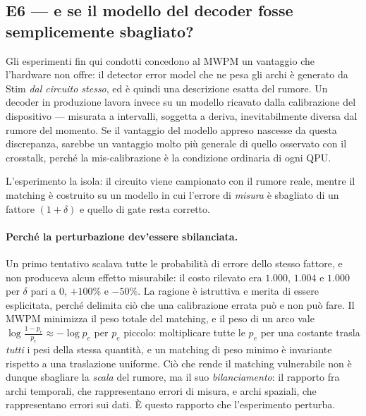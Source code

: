 \subsection{E6 --- e se il modello del decoder fosse semplicemente sbagliato?}
\label{subsec:neural_miscalibrato}

Gli esperimenti fin qui condotti concedono al \ac{MWPM} un vantaggio che l'hardware non offre: il detector error model che ne pesa gli archi è generato da Stim \emph{dal circuito stesso}, ed è quindi una descrizione esatta del rumore. Un decoder in produzione lavora invece su un modello ricavato dalla calibrazione del dispositivo --- misurata a intervalli, soggetta a deriva, inevitabilmente diversa dal rumore del momento. Se il vantaggio del modello appreso nascesse da questa discrepanza, sarebbe un vantaggio molto più generale di quello osservato con il crosstalk, perché la mis-calibrazione è la condizione ordinaria di ogni \ac{QPU}.

L'esperimento la isola: il circuito viene campionato con il rumore reale, mentre il matching è costruito su un modello in cui l'errore di \emph{misura} è sbagliato di un fattore $(1+\delta)$ e quello di gate resta corretto.

\begin{samepage}
\paragraph{Perché la perturbazione dev'essere sbilanciata.} Un primo tentativo scalava tutte le probabilità di errore dello stesso fattore, e non produceva alcun effetto misurabile: il costo rilevato era $1.000$, $1.004$ e $1.000$ per $\delta$ pari a $0$, $+100\%$ e $-50\%$. La ragione è istruttiva e merita di essere esplicitata, perché delimita ciò che una calibrazione errata può e non può fare. Il \ac{MWPM} minimizza il peso totale del matching, e il peso di un arco vale $\log\frac{1-p_e}{p_e} \approx -\log p_e$ per $p_e$ piccolo: moltiplicare tutte le $p_e$ per una costante trasla \emph{tutti} i pesi della stessa quantità, e un matching di peso minimo è invariante rispetto a una traslazione uniforme. Ciò che rende il matching vulnerabile non è dunque sbagliare la \emph{scala} del rumore, ma il suo \emph{bilanciamento}: il rapporto fra archi temporali, che rappresentano errori di misura, e archi spaziali, che rappresentano errori sui dati. È questo rapporto che l'esperimento perturba.
\end{samepage}

